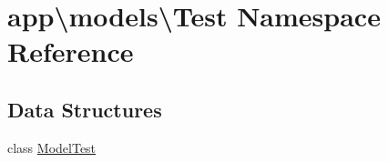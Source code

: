 \hypertarget{namespaceapp_1_1models_1_1_test}{\section{app\textbackslash{}models\textbackslash{}Test Namespace Reference}
\label{namespaceapp_1_1models_1_1_test}
}
\subsection*{Data Structures}
\begin{DoxyCompactItemize}
\item 
class \hyperlink{classapp_1_1models_1_1_test_1_1_model_test}{Model\-Test}
\end{DoxyCompactItemize}
